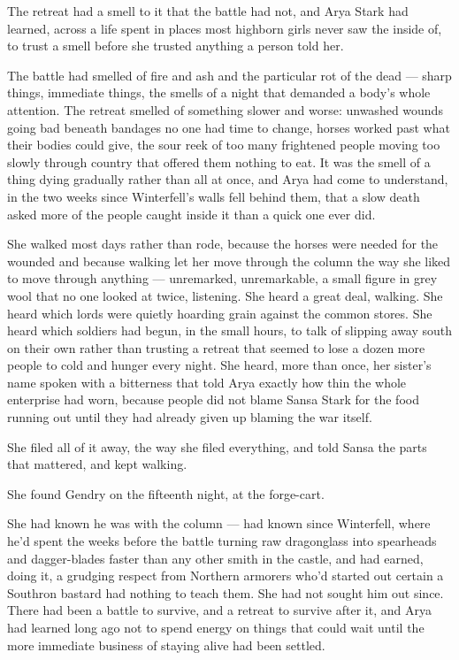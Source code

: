 The retreat had a smell to it that the battle had not, and Arya Stark had learned, across a life spent in places most highborn girls never saw the inside of, to trust a smell before she trusted anything a person told her.

The battle had smelled of fire and ash and the particular rot of the dead — sharp things, immediate things, the smells of a night that demanded a body’s whole attention. The retreat smelled of something slower and worse: unwashed wounds going bad beneath bandages no one had time to change, horses worked past what their bodies could give, the sour reek of too many frightened people moving too slowly through country that offered them nothing to eat. It was the smell of a thing dying gradually rather than all at once, and Arya had come to understand, in the two weeks since Winterfell’s walls fell behind them, that a slow death asked more of the people caught inside it than a quick one ever did.

She walked most days rather than rode, because the horses were needed for the wounded and because walking let her move through the column the way she liked to move through anything — unremarked, unremarkable, a small figure in grey wool that no one looked at twice, listening. She heard a great deal, walking. She heard which lords were quietly hoarding grain against the common stores. She heard which soldiers had begun, in the small hours, to talk of slipping away south on their own rather than trusting a retreat that seemed to lose a dozen more people to cold and hunger every night. She heard, more than once, her sister’s name spoken with a bitterness that told Arya exactly how thin the whole enterprise had worn, because people did not blame Sansa Stark for the food running out until they had already given up blaming the war itself.

She filed all of it away, the way she filed everything, and told Sansa the parts that mattered, and kept walking.

\sceneBreak

She found Gendry on the fifteenth night, at the forge-cart.

She had known he was with the column — had known since Winterfell, where he’d spent the weeks before the battle turning raw dragonglass into spearheads and dagger-blades faster than any other smith in the castle, and had earned, doing it, a grudging respect from Northern armorers who’d started out certain a Southron bastard had nothing to teach them. She had not sought him out since. There had been a battle to survive, and a retreat to survive after it, and Arya had learned long ago not to spend energy on things that could wait until the more immediate business of staying alive had been settled.

